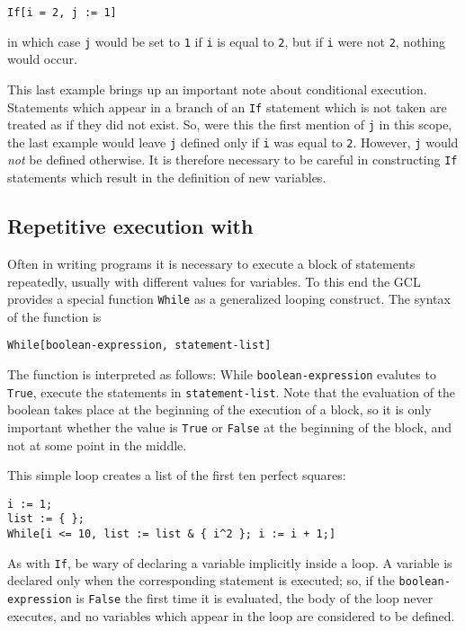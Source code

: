 \begin{verbatim}
If[i = 2, j := 1]
\end{verbatim}

\noindent in which case \verb+j+ would be set to \verb+1+ if \verb+i+
is equal to \verb+2+, but if \verb+i+ were not \verb+2+, nothing would
occur.

This last example brings up an important note about conditional
execution.  Statements which appear in a branch of an \verb+If+
statement which is not taken are treated as if they did not exist.
So, were this the first mention of \verb+j+ in this scope, the last
example would leave \verb+j+ defined only if \verb+i+ was equal to
\verb+2+.  However, \verb+j+ would {\em not} be defined otherwise.  It
is therefore necessary to be careful in constructing \verb+If+
statements which result in the definition of new variables.

\subsection{Repetitive execution with }

Often in writing programs it is necessary to execute a block of
statements repeatedly, usually with different values for variables.
To this end the GCL provides a special function \verb+While+ as a
generalized looping construct.  The syntax of the function is

\begin{verbatim}
While[boolean-expression, statement-list]
\end{verbatim}

The function is interpreted as follows: While
\verb+boolean-expression+ evalutes to \verb+True+, execute the
statements in \verb+statement-list+.  Note that the evaluation of the
boolean takes place at the beginning of the execution of a block, so
it is only important whether the value is \verb+True+ or \verb+False+
at the beginning of the block, and not at some point in the middle.

This simple loop creates a list of the first ten perfect squares: 

\begin{verbatim}
i := 1;
list := { };
While[i <= 10, list := list & { i^2 }; i := i + 1;]
\end{verbatim}

As with \verb+If+, be wary of declaring a variable implicitly inside a
loop.  A variable is declared only when the corresponding statement is
executed; so, if the \verb+boolean-expression+ is \verb+False+ the
first time it is evaluated, the body of the loop never executes, and
no variables which appear in the loop are considered to be defined.

